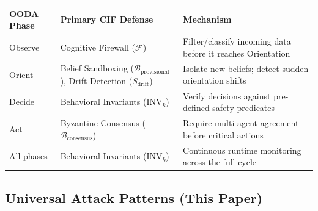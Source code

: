 \documentclass[
]{article}
\newcounter{none} %
\begin{document}
{\def\LTcaptype{none} %
\begin{longtable}[]{@{}
  >{\raggedright\arraybackslash}p{}
  >{\raggedright\arraybackslash}p{}
  >{\raggedright\arraybackslash}p{}@{}}
\toprule\noalign{}
\begin{minipage}[b]{\linewidth}\raggedright
OODA Phase
\end{minipage} & \begin{minipage}[b]{\linewidth}\raggedright
Primary CIF Defense
\end{minipage} & \begin{minipage}[b]{\linewidth}\raggedright
Mechanism
\end{minipage} \\
\midrule\noalign{}
\endhead
\bottomrule\noalign{}
\endlastfoot
Observe & Cognitive Firewall (\(\mathcal{F}\)) & Filter/classify
incoming data before it reaches Orientation \\
Orient & Belief Sandboxing (\(\mathcal{B}_{\text{provisional}}\)), Drift
Detection (\(S_{\text{drift}}\)) & Isolate new beliefs; detect sudden
orientation shifts \\
Decide & Behavioral Invariants (\(\text{INV}_k\)) & Verify decisions
against pre-defined safety predicates \\
Act & Byzantine Consensus (\(\mathcal{B}_{\text{consensus}}\)) & Require
multi-agent agreement before critical actions \\
All phases & Behavioral Invariants (\(\text{INV}_k\)) & Continuous
runtime monitoring across the full cycle \\
\end{longtable}
}

\subsection{Universal Attack Patterns (This
Paper)}\label{universal-attack-patterns-this-paper}
\end{document}
